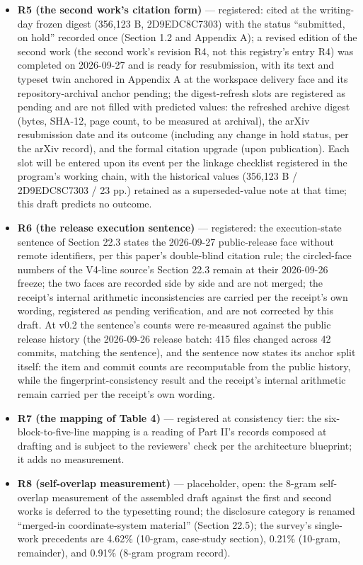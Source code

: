 \documentclass[11pt]{article}
\begin{document}
\begin{itemize}[leftmargin=1.6em,itemsep=2pt,parsep=0pt,topsep=3pt]
\item \textbf{R5 (the second work's citation form)} — registered: cited at the writing-day frozen digest (356,123 B, 2D9EDC8C7303) with the status ``submitted, on hold'' recorded once (Section 1.2 and Appendix A); a revised edition of the second work (the second work's revision R4, not this registry's entry R4) was completed on 2026-09-27 and is ready for resubmission, with its text and typeset twin anchored in Appendix A at the workspace delivery face and its repository-archival anchor pending; the digest-refresh slots are registered as pending and are not filled with predicted values: the refreshed archive digest (bytes, SHA-12, page count, to be measured at archival), the arXiv resubmission date and its outcome (including any change in hold status, per the arXiv record), and the formal citation upgrade (upon publication). Each slot will be entered upon its event per the linkage checklist registered in the program's working chain, with the historical values (356,123 B / 2D9EDC8C7303 / 23 pp.) retained as a superseded-value note at that time; this draft predicts no outcome.
\item \textbf{R6 (the release execution sentence)} — registered: the execution-state sentence of Section 22.3 states the 2026-09-27 public-release face without remote identifiers, per this paper's double-blind citation rule; the circled-face numbers of the V4-line source's Section 22.3 remain at their 2026-09-26 freeze; the two faces are recorded side by side and are not merged; the receipt's internal arithmetic inconsistencies are carried per the receipt's own wording, registered as pending verification, and are not corrected by this draft. At v0.2 the sentence's counts were re-measured against the public release history (the 2026-09-26 release batch: 415 files changed across 42 commits, matching the sentence), and the sentence now states its anchor split itself: the item and commit counts are recomputable from the public history, while the fingerprint-consistency result and the receipt's internal arithmetic remain carried per the receipt's own wording.
\item \textbf{R7 (the mapping of Table 4)} — registered at consistency tier: the six-block-to-five-line mapping is a reading of Part II's records composed at drafting and is subject to the reviewers' check per the architecture blueprint; it adds no measurement.
\item \textbf{R8 (self-overlap measurement)} — placeholder, open: the 8-gram self-overlap measurement of the assembled draft against the first and second works is deferred to the typesetting round; the disclosure category is renamed ``merged-in coordinate-system material'' (Section 22.5); the survey's single-work precedents are 4.62\% (10-gram, case-study section), 0.21\% (10-gram, remainder), and 0.91\% (8-gram program record).
\end{itemize}
\end{document}
